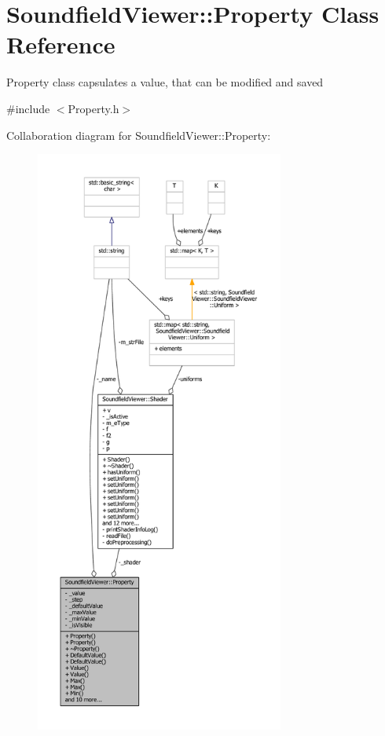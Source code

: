 \section{Soundfield\-Viewer\-:\-:Property Class Reference}
\label{classSoundfieldViewer_1_1Property}


Property class capsulates a value, that can be modified and saved  




{\ttfamily \#include $<$Property.\-h$>$}



Collaboration diagram for Soundfield\-Viewer\-:\-:Property\-:\nopagebreak
\begin{figure}[H]
\begin{center}
\leavevmode
\includegraphics[height=550pt]{d1/d63/classSoundfieldViewer_1_1Property__coll__graph}
\end{center}
\end{figure}
